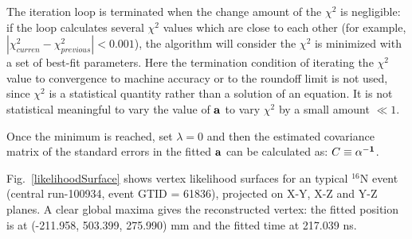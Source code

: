 The iteration loop is terminated when the change amount of the $\chi^2$ is negligible: if the loop calculates several $\chi^2$ values which are close to each other (for example, $|\chi^2_{curren}-\chi^2_{previous}|<0.001$), the algorithm will consider the $\chi^2$ is minimized with a set of best-fit parameters. Here the termination condition of iterating the $\chi^2$ value to convergence to machine
accuracy or to the roundoff limit is not used, since $\chi^2$ is a statistical quantity rather than a solution of an equation. It is not statistical meaningful to vary the value of $\bf a$ to vary $\chi^2$ by a small amount $\ll 1$.

Once the minimum is reached, set $\lambda=0$ and then the estimated covariance matrix of the standard errors in the fitted $\bf a$ can be calculated as: $C\equiv {\bf \alpha^{-1}}$.

Fig.~\ref{likelihoodSurface} shows vertex likelihood surfaces for an typical {$^{16}$}N event (central run-100934, event GTID = 61836), projected on X-Y, X-Z and Y-Z planes. A clear global maxima gives the reconstructed vertex: the fitted position is at (-211.958, 503.399, 275.990) mm and the fitted time at 217.039 ns. 

